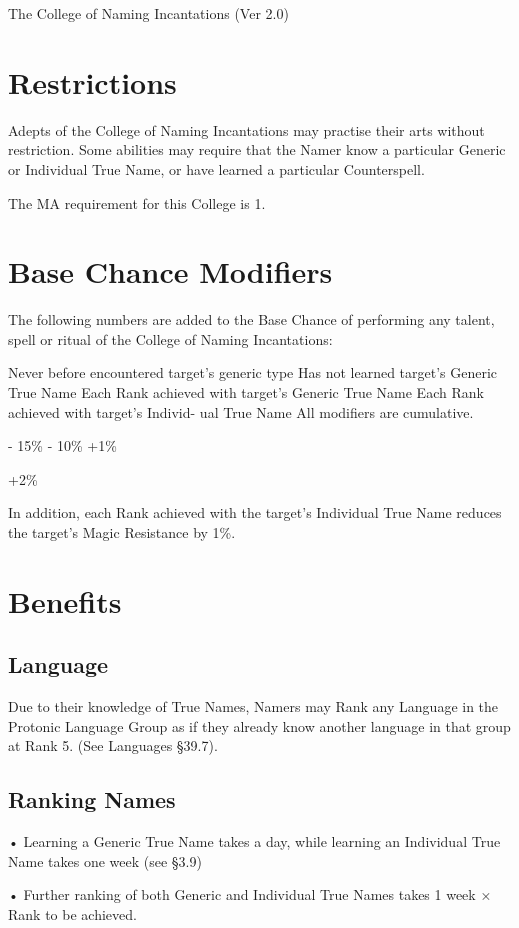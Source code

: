 \begin{Chapter}{The College of Naming Incantations (Ver 2.0)}
\section{Restrictions}

Adepts of the College of Naming Incantations may practise their arts
without restriction.  Some abilities may require that the Namer know a
particular Generic or Individual True Name, or have learned a
particular Counterspell.

The MA requirement for this College is 1. 


\section{Base Chance Modifiers}

The following numbers are added to the Base Chance of performing any
talent, spell or ritual of the College of Naming Incantations:

Never before encountered target’s generic 
type 
Has not learned target’s Generic True 
Name 
Each Rank achieved with target’s Generic 
True Name 
Each Rank achieved with target’s Individ-
ual True Name 
All modifiers are cumulative. 

-
15\%  
-
10\% 
+1\% 

+2\% 

In addition, each Rank achieved with the target’s Individual True Name
reduces the target’s Magic Resistance by 1\%.

\section{Benefits}

\subsection{Language}

Due to their knowledge of True Names, Namers may Rank any Language in
the Protonic Language Group as if they already know another language
in that group at Rank 5. (See Languages §39.7).

\subsection{Ranking Names}

• Learning a Generic True Name takes a day, while 
learning  an  Individual  True  Name  takes  one  week 
(see §3.9)  

•  Further  ranking  of  both  Generic  and  Individual 
True Names takes 1 week × Rank to be achieved.  


\end{Chapter}
